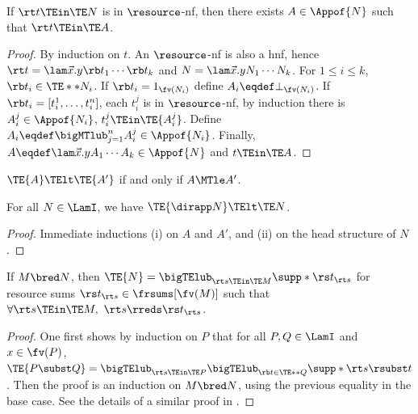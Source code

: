 \setcounter{lem:normal-approximants}{\thetheorem}
\begin{lemma}
\label{lem:normal-approximants}
	If $\rt t \TEin \TE N$ is in $\resource$-nf, then
	there exists $A \in \Appof{N}$ such that $\rt t \TEin \TE A$.
\end{lemma}

	\begin{proof}
	By induction on $t$. An $\resource$-nf is also a hnf, hence
	$\rt t = \lam \vec{x}.y\rb t_1\cdots\rb t_k$ and
	$N = \lam \vec{x}.yN_1\cdots N_k$.
	For $1 \leq i \leq k$, $\rb t_i \in \TE**{N_i}$.
	If $\rb t_i = 1_{\fv(N_i)}$ define $A_i \eqdef \bot_{\fv(N_i)}$.
	If $\rb t_i = [t_i^1,\dots,t_i^n]$,
	each $t_i^j$ is in $\resource$-nf, by induction
	there is $A_i^j \in \Appof{N_i}$, $t_i^j \TEin \TE{A_i^j}$.
	Define $A_i \eqdef \bigMTlub_{j=1}^n A_i^j \in \Appof{N_i}$.
	Finally, $A \eqdef \lam \vec{x}.yA_1\cdots A_k \in \Appof{N}$
	and $t \TEin \TE A$.
	\end{proof}

\setcounter{lem:TE-monotone}{\thetheorem}
\begin{lemma}[Monotonicity of $\TE{-}$]\mbox{}
\label{lem:TE-monotone}
	\bsub
	\item $\TE{A} \TElt \TE{A'}$ if and only if $A \MTle A'$.
	\item For all $N \in \LamI$, we have $\TE{\dirapp N} \TElt \TE N$.
	\esub
\end{lemma}

	\begin{proof}
	Immediate inductions (i) on $A$ and $A'$,
	and (ii) on the head structure of $N$.
	\end{proof}

\setcounter{lem:rred-simul-bred}{\thetheorem}
\begin{lemma}
\label{lem:rred-simul-bred}
	If $M \bred N$, then $\TE{N} = 
	\bigTElub_{\rt s \TEin \TE M} \supp*{\rs t_{\rt s}}$
	for resource sums $\rs t_{\rt s} \in \frsums[\fv(M)]$
	such that $\forall \rt s \TEin \TE M,\ \rt s \rreds \rs t_{\rt s}$.
\end{lemma}

	\begin{proof}
	One first shows by induction on $P$ that
	for all $P,Q \in \LamI$ and $x \in \fv(P)$,
	$\TE{P \subst Q} = \bigTElub_{\rt s \TEin \TE P}
	\bigTElub_{\rb t \in \TE** Q} \supp*{ \rt s \rsubst t }$.
	Then the proof is an induction on $M \bred N$,
	using the previous equality in the base case.
	See the details of a similar proof in 
	\cite[Lemmas 4.1 and 4.2]{CerdaVaux23}.
	\end{proof}

